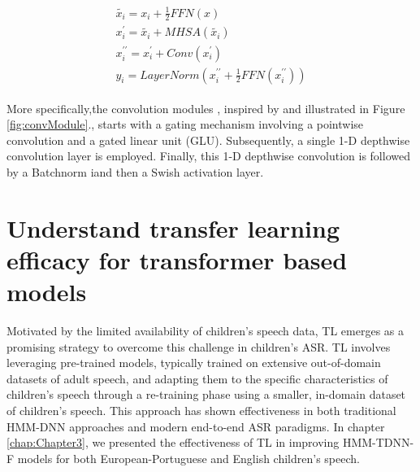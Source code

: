 \begin{align}
    \begin{split}
    \tilde{x_i} = x_i + \frac{1}{2}FFN(x) \\
    x_i^{\prime} =\tilde{x_i} + MHSA(\tilde{x_i}) \\
    x_i^{\prime\prime} = x_i^{\prime} + Conv(x_i^{\prime}) \\
    y_i = LayerNorm(x_i^{\prime\prime} + \frac{1}{2}FFN(x_i^{\prime\prime}))
    \end{split}
\end{align}

More specifically,the convolution modules , inspired by \cite{wu2020lite} and illustrated in Figure \ref{fig:convModule}., starts with a gating mechanism \cite{dauphin2017language} involving a pointwise convolution and a gated linear unit (GLU). Subsequently, a single 1-D depthwise convolution layer is employed. Finally, this 1-D depthwise convolution is followed by a Batchnorm iand then a Swish activation layer.


\section{Understand transfer learning efficacy for transformer based models}
Motivated by the limited availability of children's speech data, TL emerges as a promising strategy to overcome this challenge in children's ASR. TL involves leveraging pre-trained models, typically trained on extensive out-of-domain datasets of adult speech, and adapting them to the specific characteristics of children's speech through a re-training phase using a smaller, in-domain dataset of children's speech. This approach has shown effectiveness in both traditional HMM-DNN approaches \cite{shivakumar2020transfer} and modern end-to-end ASR paradigms\cite{sri_end2end,gelin2021endtoend}. In chapter \ref{chap:Chapter3}, we presented the effectiveness of TL in improving HMM-TDNN-F models for both European-Portuguese and English children's speech.

